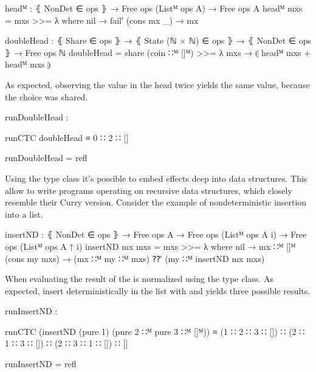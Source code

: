 \begin{code}
headᴹ : ⦃ NonDet ∈ ops ⦄ → Free ops (Listᴹ ops A) → Free ops A
headᴹ mxs = mxs >>= λ where
  nil         → fail′
  (cons mx _) → mx

doubleHead : ⦃ Share ∈ ops ⦄ → ⦃ State (ℕ × ℕ) ∈ ops ⦄ → ⦃ NonDet ∈ ops ⦄ →
  Free ops ℕ
doubleHead = share (coin ∷ᴹ []ᴹ) >>= λ mxs → ⦇ headᴹ mxs + headᴹ mxs ⦈
\end{code}
As expected, observing the value in the head twice yields the same value,
because the choice was shared.

\begin{center}
\begin{code}
runDoubleHead :
\end{code}
\begin{code}[inline]
 runCTC doubleHead ≡ 0 ∷ 2 ∷ []
\end{code}
\begin{code}
runDoubleHead = refl
\end{code}
\end{center}
Using the  type class it's possible to embed effects
deep into data structures.
This allow to write programs operating on recursive data structures, which
closely resemble their Curry version.
Consider the example of nondeterministic insertion into a list.

\begin{code}
insertND : ⦃ NonDet ∈ ops ⦄ →
  Free ops A → Free ops (Listᴹ ops A {i}) → Free ops (Listᴹ ops A {↑ i})
insertND mx mxs = mxs >>= λ where
  nil            → mx ∷ᴹ []ᴹ
  (cons my mxs)  → (mx ∷ᴹ my ∷ᴹ mxs) ⁇′ (my ∷ᴹ insertND mx mxs)
\end{code}
When evaluating the result of  the 
is normalized using the type class.
As expected, insert  deterministically in the list with
 and  yields three possible results.

\begin{center}
\begin{code}
runInsertND :
\end{code}
\begin{code}[inline]
 runCTC (insertND (pure 1) (pure 2 ∷ᴹ pure 3 ∷ᴹ []ᴹ)) ≡
   (1 ∷ 2 ∷ 3 ∷ []) ∷ (2 ∷ 1 ∷ 3 ∷ []) ∷ (2 ∷ 3 ∷ 1 ∷ []) ∷ []
\end{code}
\begin{code}
runInsertND = refl
\end{code}
\end{center}


